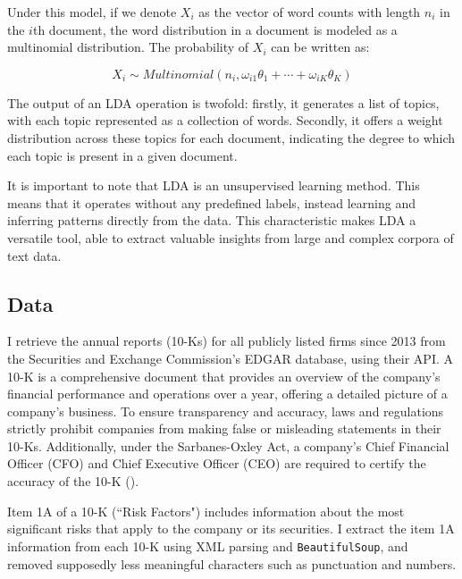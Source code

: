 \documentclass[12pt, letterpaper]{article}
\begin{document}
Under this model, if we denote $X_i$ as the vector of word counts with length $n_i$ in the $i$th document, the word distribution in a document is modeled as a multinomial distribution. The probability of $X_i$ can be written as:

\begin{equation}
X_i \sim Multinomial\left(n_i, \omega_{i 1} \theta_1+\cdots+\omega_{i K} \theta_K\right)
\end{equation}


The output of an LDA operation is twofold: firstly, it generates a list of topics, with each topic represented as a collection of words. Secondly, it offers a weight distribution across these topics for each document, indicating the degree to which each topic is present in a given document.

It is important to note that LDA is an unsupervised learning method. This means that it operates without any predefined labels, instead learning and inferring patterns directly from the data. This characteristic makes LDA a versatile tool, able to extract valuable insights from large and complex corpora of text data.

\subsection{Data}

I retrieve the annual reports (10-Ks) for all publicly listed firms since 2013 from the Securities and Exchange Commission's EDGAR database, using their API. A 10-K is a comprehensive document that provides an overview of the company's financial performance and operations over a year, offering a detailed picture of a company's business.  To ensure transparency and accuracy, laws and regulations strictly prohibit companies from making false or misleading statements in their 10-Ks. Additionally, under the Sarbanes-Oxley Act, a company's Chief Financial Officer (CFO) and Chief Executive Officer (CEO) are required to certify the accuracy of the 10-K (\cite{SEC_Office_of_Investor_Education_and_Advocacy2011-tw}).

Item 1A of a 10-K (``Risk Factors") includes information about the most significant risks that apply to the company or its securities.  I extract the item 1A information from each 10-K using XML parsing and \texttt{BeautifulSoup}, and removed supposedly less meaningful characters such as punctuation and numbers.
\end{document}
